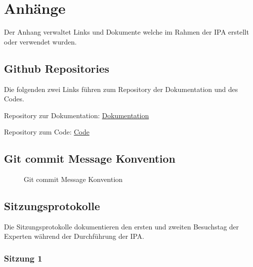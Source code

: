 \chapter{Anhänge}
Der Anhang verwaltet Links und Dokumente welche im Rahmen der IPA erstellt oder 
verwendet wurden.

\section{Github Repositories}
Die folgenden zwei Links führen zum Repository der Dokumentation und des Codes.

Repository zur Dokumentation: \href{https://github.com/Vakmeth/ipa}{Dokumentation}

Repository zum Code: \href{https://github.com/Vakmeth/hitobito}{Code}

\section{Git commit Message Konvention}
\label{sec:gitconv}
\begin{figure}[h]
    \centering
    \caption{Git commit Message Konvention}
\end{figure}

\section{Sitzungsprotokolle}
Die Sitzungsprotokolle dokumentieren den ersten und zweiten Besuchstag der 
Experten während der Durchführung der IPA. 

\subsection{Sitzung 1}

